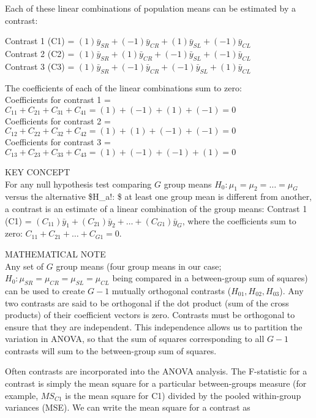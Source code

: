 \documentclass[
]{report}
\begin{document}
Each of these linear combinations of population means can be estimated by a contrast:

Contrast 1 (C1) = \((1)\bar y_{SR} + (-1)\bar y_{CR} + (1)\bar y_{SL} + (-1)\bar y_{CL}\)\\
Contrast 2 (C2) = \((1)\bar y_{SR} + (1)\bar y_{CR} + (-1)\bar y_{SL} + (-1)\bar y_{CL}\)\\
Contrast 3 (C3) = \((1)\bar y_{SR} + (-1)\bar y_{CR} + (-1)\bar y_{SL} + (1)\bar y_{CL}\)

The coefficients of each of the linear combinations sum to zero:\\
Coefficients for contrast 1 = \(C_{11} + C_{21} + C_{31} + C_{41} = (1) + (-1) + (1) + (-1) = 0\)\\
Coefficients for contrast 2 = \(C_{12} + C_{22} + C_{32} + C_{42} = (1) + (1) + (-1) + (-1) = 0\)\\
Coefficients for contrast 3 = \(C_{13} + C_{23} + C_{33} + C_{43} = (1) + (-1) + (-1) + (1) = 0\)

KEY CONCEPT\\
For any null hypothesis test comparing \(G\) group means \(H_0\!: \mu_1 = \mu_2 = \dots = \mu_G\) versus the alternative \$H\_a!: \$ at least one group mean is different from another, a contrast is an estimate of a linear combination of the group means: Contrast 1 (C1) = \((C_{11})\bar y_1 + (C_{21})\bar y_2 + \dots + (C_{G1})\bar y_G\), where the coefficients sum to zero: \(C_{11} + C_{21} + \dots + C_{G1} = 0\).

MATHEMATICAL NOTE\\
Any set of \(G\) group means (four group means in our case; \(H_0: \mu_{SR} = \mu_{CR} = \mu_{SL} = \mu_{CL}\) being compared in a between-group sum of squares) can be used to create \(G - 1\) mutually orthogonal contrasts (\(H_{01}, H_{02}, H_{03}\)). Any two contrasts are said to be orthogonal if the dot product (sum of the cross products) of their coefficient vectors is zero. Contrasts must be orthogonal to ensure that they are independent. This independence allows us to partition the variation in ANOVA, so that the sum of squares corresponding to all \(G - 1\) contrasts will sum to the between-group sum of squares.

Often contrasts are incorporated into the ANOVA analysis. The F-statistic for a contrast is simply the mean square for a particular between-groups measure (for example, \(MS_{C1}\) is the mean square for C1) divided by the pooled within-group variances (MSE). We can write the mean square for a contrast as
\end{document}
